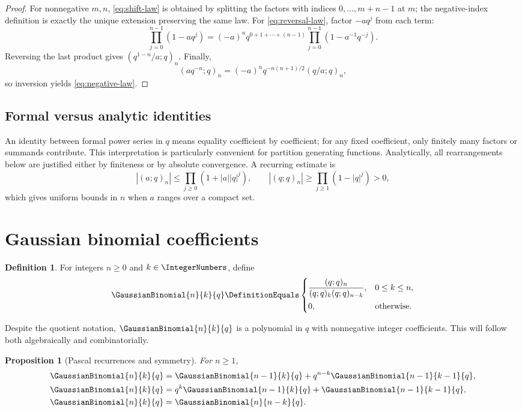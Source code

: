 \documentclass[11pt,oneside]{article}
\newtheorem{proposition}[theorem]{Proposition}
\theoremstyle{definition}
\newtheorem{definition}[theorem]{Definition}
\begin{document}
\begin{proof}
For nonnegative $m,n$, \eqref{eq:shift-law} is obtained by splitting the factors with indices $0,\ldots,m+n-1$ at $m$; the negative-index definition is exactly the unique extension preserving the same law. For \eqref{eq:reversal-law}, factor $-aq^j$ from each term:
\[
 \prod_{j=0}^{n-1}(1-aq^j)
 =(-a)^nq^{0+1+\cdots+(n-1)}
   \prod_{j=0}^{n-1}(1-a^{-1}q^{-j}).
\]
Reversing the last product gives $(q^{1-n}/a;q)_n$. Finally,
\[
 (aq^{-n};q)_n=(-a)^nq^{-n(n+1)/2}(q/a;q)_n,
\]
so inversion yields \eqref{eq:negative-law}.
\end{proof}

\subsection{Formal versus analytic identities}

An identity between formal power series in $q$ means equality coefficient by coefficient; for any fixed coefficient, only finitely many factors or summands contribute. This interpretation is particularly convenient for partition generating functions. Analytically, all rearrangements below are justified either by finiteness or by absolute convergence. A recurring estimate is
\[
 |(a;q)_n|\le \prod_{j\ge0}(1+|a||q|^j),\qquad
 |(q;q)_n|\ge \prod_{j\ge1}(1-|q|^j)>0,
\]
which gives uniform bounds in $n$ when $a$ ranges over a compact set.

\section{Gaussian binomial coefficients}

\begin{definition}
For integers $n\ge0$ and $k\in\IntegerNumbers$, define
\[
 \GaussianBinomial{n}{k}{q}\DefinitionEquals
 \begin{cases}
 \dfrac{(q;q)_n}{(q;q)_k(q;q)_{n-k}},&0\le k\le n,\\[0.8em]
 0,&\text{otherwise}.
 \end{cases}
\]
\end{definition}

Despite the quotient notation, $\GaussianBinomial{n}{k}{q}$ is a polynomial in $q$ with nonnegative integer coefficients. This will follow both algebraically and combinatorially.

\begin{proposition}[Pascal recurrences and symmetry]\label{prop:q-pascal}
For $n\ge1$,
\begin{align}
 \GaussianBinomial{n}{k}{q}&=\GaussianBinomial{n-1}{k}{q}+q^{n-k}\GaussianBinomial{n-1}{k-1}{q},\label{eq:qpascal1}\\
 \GaussianBinomial{n}{k}{q}&=q^k\GaussianBinomial{n-1}{k}{q}+\GaussianBinomial{n-1}{k-1}{q},\label{eq:qpascal2}\\
 \GaussianBinomial{n}{k}{q}&=\GaussianBinomial{n}{n-k}{q}.\label{eq:q-symmetry}
\end{align}
\end{proposition}
\end{document}
